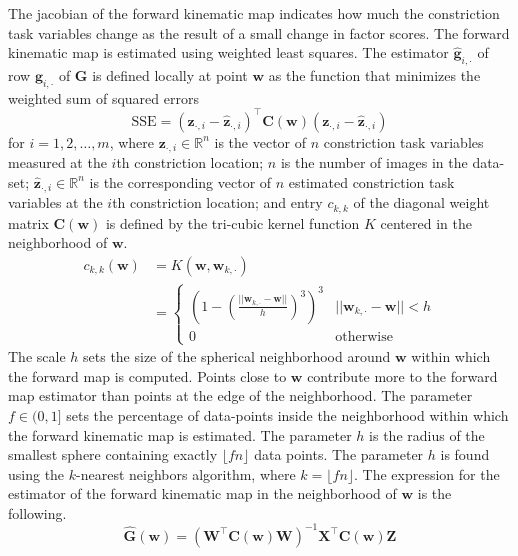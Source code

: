 \documentclass[reprint]{JASAnew}\usepackage[]{graphicx}\usepackage[]{color}
\begin{document}
%
The jacobian of the forward kinematic map indicates how much the constriction task variables change as the result of a small change in factor scores.
%
The forward kinematic map is estimated using weighted least squares. 
% 
The estimator $\mathbf{\hat{g}}_{i,\cdot}$ of row $\mathbf{g}_{i,\cdot}$ of $\mathbf{G}$ is defined locally at point $\mathbf{w}$ as the function that minimizes the weighted sum of squared errors
%
\begin{equation}
\mathrm{SSE} 
=
\left( \mathbf{z}_{\cdot,i} - \mathbf{\hat{z}}_{\cdot,i} \right)^\intercal
\mathbf{C}(\mathbf{w})
\left( \mathbf{z}_{\cdot,i} - \mathbf{\hat{z}}_{\cdot,i} \right)
\end{equation}
%
for $i=1,2,\ldots,m$,
% 
where $\mathbf{z}_{\cdot,i} \in \mathbb{R}^{n}$ is the vector of $n$ constriction task variables measured at the $i$th constriction location; 
%
$n$ is the number of images in the data-set; 
%
$\mathbf{\hat{z}}_{\cdot,i} \in \mathbb{R}^{n}$ is the corresponding vector of $n$ estimated constriction task variables at the $i$th constriction location; and 
%
entry $c_{k,k}$ of the diagonal weight matrix $\mathbf{C}(\mathbf{w})$ is defined by the tri-cubic kernel function $K$ centered in the neighborhood of $\mathbf{w}$.
%
\begin{align}\label{eq:gaussiankernel}
c_{k,k} (\mathbf{w})
&=
K(\mathbf{w},\mathbf{w}_{k,\cdot}) \\
&= 
\begin{cases}
\left( 1 - \left( \frac{\lvert\lvert \mathbf{w}_{k,\cdot} - \mathbf{w} \rvert\rvert}{h} \right)^3 \right)^3 & \lvert\lvert \mathbf{w}_{k,\cdot} - \mathbf{w} \rvert\rvert < h \\
0 & \text{otherwise}
\end{cases} 
\end{align}
%
The scale $h$ sets the size of the spherical neighborhood around $\mathbf{w}$ within which the forward map is computed. 
%
Points close to $\mathbf{w}$ contribute more to the forward map estimator than points at the edge of the neighborhood.
%
The parameter $f\in (0,1]$ sets the percentage of data-points inside the neighborhood within which the forward kinematic map is estimated. The parameter $h$ is the radius of the smallest sphere containing exactly $\lfloor fn \rfloor$ data points. The parameter $h$ is found using the $k$-nearest neighbors algorithm, where $k = \lfloor fn \rfloor$.
%
The expression for the estimator of the forward kinematic map in the neighborhood of $\mathbf{w}$ is the following. 
\begin{equation}
\label{eq:lsqestimator}
\mathbf{\hat{G}} (\mathbf{w})
=
\left( \mathbf{W}^\intercal \mathbf{C}(\mathbf{w}) \mathbf{W} \right)^{-1} \mathbf{X}^\intercal \mathbf{C}(\mathbf{w}) \mathbf{Z}
\end{equation}
\end{document}
